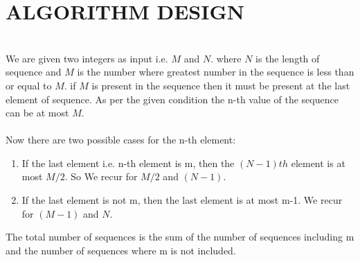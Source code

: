 \documentclass[conference]{IEEEtran}
\begin{document}
\section{ALGORITHM DESIGN}\\
We are given two integers as input i.e. \begin{math}
M\end{math} and \begin{math}
N\end{math}. where \begin{math}
N\end{math} is the length of sequence and \begin{math}
M\end{math} is the number where greatest number in the sequence is less than or equal to \begin{math}
M\end{math}. if \begin{math}
M\end{math} is present in the sequence then it must be present at the last element of sequence. As per the given condition the n-th value of the sequence can be at most \begin{math}
M\end{math}.\\\\
Now there are two possible cases for the n-th element:
\renewcommand{\labelenumi}{\alph{enumi}}
\begin{enumerate}
 \setcounter{enumi}{0}
    \item If the last element i.e. n-th element is m, then the \begin{math}
(N-1)th\end{math} element is at most \begin{math}
M/2\end{math}. So We recur for \begin{math}
M/2\end{math} and \begin{math}
(N-1)\end{math}.
    \item If the last element is not m, then the last element is at most m-1. We recur for \begin{math}
(M-1)\end{math} and \begin{math}
N\end{math}.\\
\end{enumerate}
The total number of sequences is the sum of the number of sequences including m and the number of sequences where m is not included.\\ 
\end{document}
